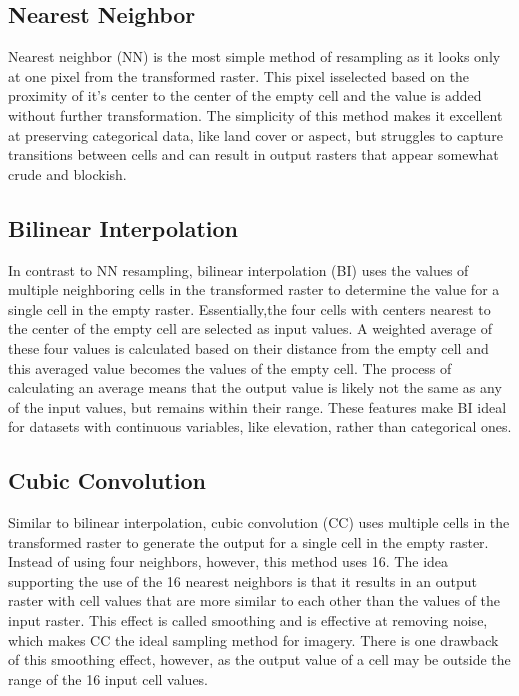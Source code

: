 \documentclass[
]{book}
\begin{document}
\hypertarget{nearest-neighbor-1}{%
\subsection{Nearest Neighbor}\label{nearest-neighbor-1}}

Nearest neighbor (NN) is the most simple method of resampling as it looks only at one pixel from the transformed raster. This pixel isselected based on the proximity of it's center to the center of the empty cell and the value is added without further transformation. The simplicity of this method makes it excellent at preserving categorical data, like land cover or aspect, but struggles to capture transitions between cells and can result in output rasters that appear somewhat crude and blockish.

\hypertarget{bilinear-interpolation}{%
\subsection{Bilinear Interpolation}\label{bilinear-interpolation}}

In contrast to NN resampling, bilinear interpolation (BI) uses the values of multiple neighboring cells in the transformed raster to determine the value for a single cell in the empty raster. Essentially,the four cells with centers nearest to the center of the empty cell are selected as input values. A weighted average of these four values is calculated based on their distance from the empty cell and this averaged value becomes the values of the empty cell. The process of calculating an average means that the output value is likely not the same as any of the input values, but remains within their range. These features make BI ideal for datasets with continuous variables, like elevation, rather than categorical ones.

\hypertarget{cubic-convolution}{%
\subsection{Cubic Convolution}\label{cubic-convolution}}

Similar to bilinear interpolation, cubic convolution (CC) uses multiple cells in the transformed raster to generate the output for a single cell in the empty raster. Instead of using four neighbors, however, this method uses 16. The idea supporting the use of the 16 nearest neighbors is that it results in an output raster with cell values that are more similar to each other than the values of the input raster. This effect is called smoothing and is effective at removing noise, which makes CC the ideal sampling method for imagery. There is one drawback of this smoothing effect, however, as the output value of a cell may be outside the range of the 16 input cell values.
\end{document}
